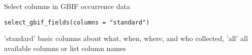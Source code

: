 \documentclass[a4paper]{book}
\begin{document}
%
\begin{Description}
Select columns in GBIF occurrence data
\end{Description}
%
\begin{Usage}
\begin{verbatim}
select_gbif_fields(columns = "standard")
\end{verbatim}
\end{Usage}
%
\begin{Arguments}
\begin{ldescription}
\item[\code{columns}] 'standard' basic columns about what, when, where, and who collected, 'all' all available columns or list column names
\end{ldescription}
\end{Arguments}
%
\end{document}
